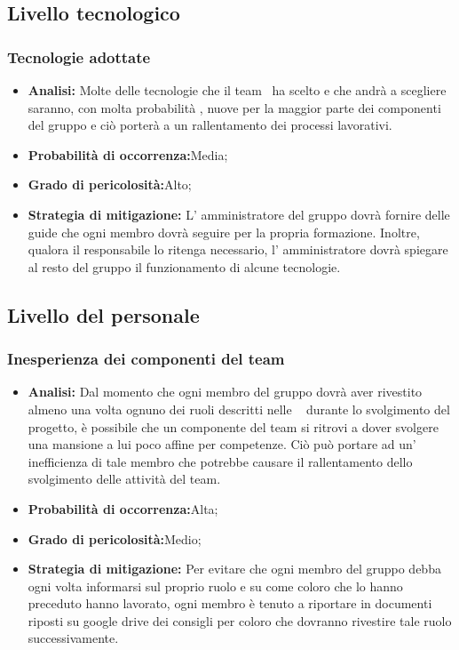 \subsection{Livello tecnologico}
\subsubsection{Tecnologie adottate}
	\begin{itemize}
	\item \textbf{Analisi: }Molte delle tecnologie che il team \gruppo ~ha scelto e che andrà a scegliere saranno, con molta probabilità , nuove per la maggior parte dei componenti del gruppo e ciò porterà a un rallentamento dei processi lavorativi.
	\item \textbf{Probabilità di occorrenza:}Media;
	\item \textbf{Grado di pericolosità:}Alto;
	\item \textbf{Strategia di mitigazione: }L' amministratore del gruppo dovrà fornire delle guide che ogni membro dovrà seguire per la propria formazione. Inoltre, qualora il responsabile lo ritenga necessario, l' amministratore dovrà spiegare al resto del gruppo il funzionamento di alcune tecnologie.
	\end{itemize}
\subsection{Livello del personale}
\subsubsection{Inesperienza dei componenti del team}
	\begin{itemize}
	\item \textbf{Analisi: }Dal momento che ogni membro del gruppo dovrà aver rivestito almeno una volta  ognuno dei ruoli descritti nelle \infoNDP~ durante lo svolgimento del progetto, è possibile che un componente del team si ritrovi a dover svolgere una mansione a lui poco affine per competenze. Ciò può portare ad un' inefficienza di tale membro che potrebbe causare il rallentamento dello svolgimento delle attività del team.
	\item \textbf{Probabilità di occorrenza:}Alta;
	\item \textbf{Grado di pericolosità:}Medio;
	\item \textbf{Strategia di mitigazione: }Per evitare che ogni membro del gruppo debba ogni volta informarsi sul proprio ruolo e su come coloro che lo hanno preceduto hanno lavorato, ogni membro è  tenuto a riportare in documenti riposti su google drive dei consigli per coloro che dovranno rivestire tale ruolo successivamente.
	\end{itemize}

